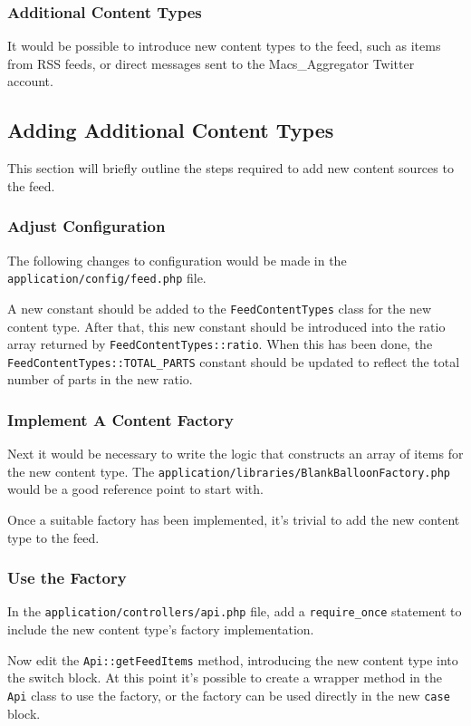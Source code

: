 \subsubsection{Additional Content Types}
It would be possible to introduce new content types to the feed, such as items from RSS feeds, or direct messages sent to the Macs\_Aggregator Twitter account.

\subsection{Adding Additional Content Types}
This section will briefly outline the steps required to add new content sources to the feed.

\subsubsection{Adjust Configuration}
The following changes to configuration would be made in the \texttt{application/config/feed.php} file.

A new constant should be added to the \texttt{FeedContentTypes} class for the new content type. After that, this new constant should be introduced into the ratio array returned by \texttt{FeedContentTypes::ratio}. When this has been done, the \texttt{FeedContentTypes::TOTAL\_PARTS} constant should be updated to reflect the total number of parts in the new ratio.

\subsubsection{Implement A Content Factory}
Next it would be necessary to write the logic that constructs an array of items for the new content type. The \texttt{application/libraries/BlankBalloonFactory.php} would be a good reference point to start with.

Once a suitable factory has been implemented, it's trivial to add the new content type to the feed.

\subsubsection{Use the Factory}
In the \texttt{application/controllers/api.php} file, add a \texttt{require\_once} statement to include the new content type's factory implementation.

Now edit the \texttt{Api::getFeedItems} method, introducing the new content type into the switch block. At this point it's possible to create a wrapper method in the \texttt{Api} class to use the factory, or the factory can be used directly in the new \texttt{case} block.
